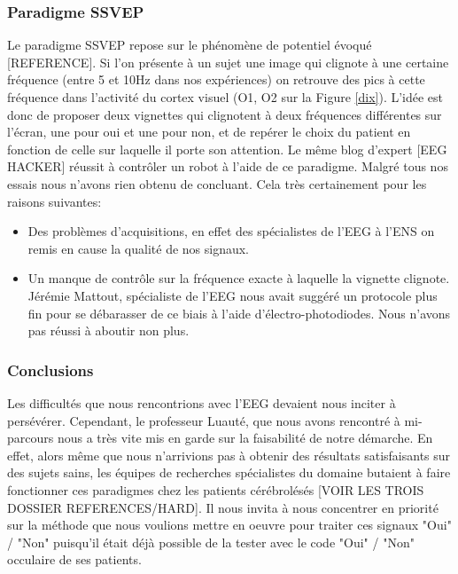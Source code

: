 \documentclass[11pt,a4paper]{article}
\theoremstyle{plain}
\theoremstyle{definition}
\begin{document}
\subsubsection{Paradigme SSVEP}

Le paradigme SSVEP repose sur le phénomène de potentiel évoqué [REFERENCE]. Si l'on présente à un sujet une image qui clignote à une certaine fréquence (entre 5 et 10Hz dans nos expériences) on retrouve 
des pics à cette fréquence dans l'activité du cortex visuel (O1, O2 sur la Figure \ref{dix}). L'idée est donc de proposer deux vignettes qui clignotent à deux fréquences différentes sur l'écran, une pour
oui et une pour non, et de repérer le choix du patient en fonction de celle sur laquelle il porte son attention. Le même blog d'expert [EEG HACKER] réussit à contrôler un robot à l'aide de ce paradigme.
Malgré tous nos essais nous n'avons rien obtenu de concluant. Cela très certainement pour les raisons suivantes:

\begin{itemize}
\item Des problèmes d'acquisitions, en effet des spécialistes de l'EEG à l'ENS on remis en cause la qualité de nos signaux.
\item Un manque de contrôle sur la fréquence exacte à laquelle la vignette clignote. Jérémie Mattout, spécialiste de l'EEG nous avait suggéré un protocole
plus fin pour se débarasser de ce biais à l'aide d'électro-photodiodes. Nous n'avons pas réussi à aboutir non plus.
\end{itemize}

\subsubsection{Conclusions}

Les difficultés que nous rencontrions avec l'EEG devaient nous inciter à persévérer. Cependant, le professeur Luauté, que nous avons rencontré à mi-parcours nous a très vite 
mis en garde sur la faisabilité de notre démarche. En effet, alors même que nous n'arrivions pas à obtenir des résultats satisfaisants sur des sujets sains, les équipes de recherches spécialistes 
du domaine butaient à faire fonctionner ces paradigmes chez les patients cérébrolésés [VOIR LES TROIS DOSSIER REFERENCES/HARD]. Il nous invita à nous concentrer en priorité sur la méthode que nous 
voulions mettre en oeuvre pour traiter ces signaux "Oui" / "Non" puisqu'il était déjà possible de la tester avec le code "Oui" / "Non" occulaire de ses patients. 
\end{document}
